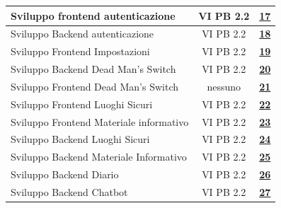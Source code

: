 \documentclass[a4paper,12pt]{article}
\newcommand{\ignoreglossary}{}
\begin{document}
\begin{center}
\begin{tabular}{|p{}|c|c|}
Sviluppo frontend autenticazione & VI \ignoreglossary{PB} 2.2 & \href{https://github.com/SWE-BitByBit/SWE-docs/issues/17}{\textbf{17}} \\
\hline
Sviluppo Backend autenticazione & VI \ignoreglossary{PB} 2.2 & \href{https://github.com/SWE-BitByBit/SWE-docs/issues/18}{\textbf{18}} \\
\hline
Sviluppo Frontend Impostazioni & VI \ignoreglossary{PB} 2.2 & \href{https://github.com/SWE-BitByBit/SWE-docs/issues/19}{\textbf{19}} \\
\hline
Sviluppo Backend Dead Man's Switch & VI \ignoreglossary{PB} 2.2 & \href{https://github.com/SWE-BitByBit/SWE-docs/issues/20}{\textbf{20}} \\
\hline
Sviluppo Frontend Dead Man's Switch & nessuno & \href{https://github.com/SWE-BitByBit/SWE-docs/issues/21}{\textbf{21}} \\
\hline
Sviluppo Frontend Luoghi Sicuri & VI \ignoreglossary{PB} 2.2 & \href{https://github.com/SWE-BitByBit/SWE-docs/issues/22}{\textbf{22}} \\
\hline
Sviluppo Frontend Materiale informativo & VI \ignoreglossary{PB} 2.2 & \href{https://github.com/SWE-BitByBit/SWE-docs/issues/23}{\textbf{23}} \\
\hline
Sviluppo Backend Luoghi Sicuri & VI \ignoreglossary{PB} 2.2 & \href{https://github.com/SWE-BitByBit/SWE-docs/issues/24}{\textbf{24}} \\
\hline
Sviluppo Backend Materiale Informativo & VI \ignoreglossary{PB} 2.2 & \href{https://github.com/SWE-BitByBit/SWE-docs/issues/25}{\textbf{25}} \\
\hline
Sviluppo Backend Diario & VI \ignoreglossary{PB} 2.2 & \href{https://github.com/SWE-BitByBit/SWE-docs/issues/26}{\textbf{26}} \\
\hline
Sviluppo Backend Chatbot & VI \ignoreglossary{PB} 2.2 & \href{https://github.com/SWE-BitByBit/SWE-docs/issues/27}{\textbf{27}} \\
\hline
\end{tabular}
\end{center}
\end{document}
